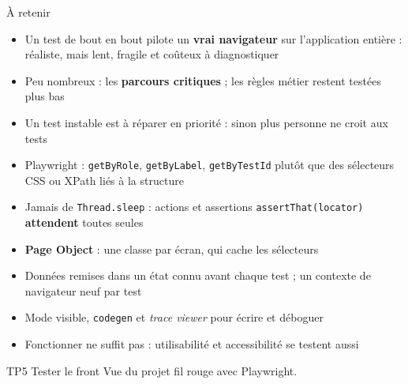 \documentclass[aspectratio=169,10pt]{beamer}
\begin{document}
\begin{frame}{À retenir}
  \small
  \begin{itemize}
    \item Un test de bout en bout pilote un \textbf{vrai navigateur} sur l'application entière : réaliste, mais lent, fragile et coûteux à diagnostiquer
    \item Peu nombreux : les \textbf{parcours critiques} ; les règles métier restent testées plus bas
    \item Un test instable est à réparer en priorité : sinon plus personne ne croit aux tests
    \item Playwright : \texttt{getByRole}, \texttt{getByLabel}, \texttt{getByTestId} plutôt que des sélecteurs CSS ou XPath liés à la structure
    \item Jamais de \texttt{Thread.sleep} : actions et assertions \texttt{assertThat(locator)} \textbf{attendent} toutes seules
    \item \textbf{Page Object} : une classe par écran, qui cache les sélecteurs
    \item Données remises dans un état connu avant chaque test ; un contexte de navigateur neuf par test
    \item Mode visible, \texttt{codegen} et \textit{trace viewer} pour écrire et déboguer
    \item Fonctionner ne suffit pas : utilisabilité et accessibilité se testent aussi
  \end{itemize}
  \vspace{1mm}
  \begin{exampleblock}{TP5}
    Tester le front Vue du projet fil rouge avec Playwright.
  \end{exampleblock}
\end{frame}

\rquestionslide
\end{document}
